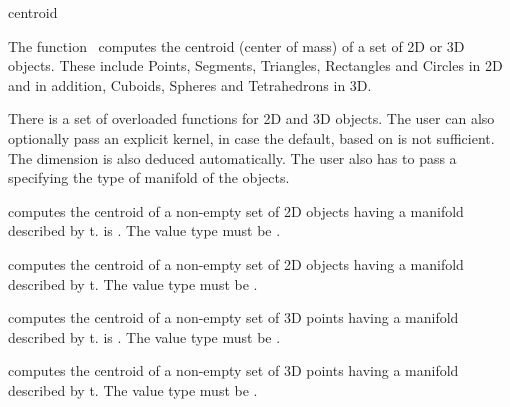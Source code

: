 
\begin{ccRefFunction}{centroid}  

\ccDefinition
  
The function \ccRefName\ computes the centroid (center of mass) of a set
of 2D or 3D objects. These include Points, Segments, Triangles, Rectangles and Circles in 2D and in addition, Cuboids, Spheres and Tetrahedrons in 3D.


There is a set of overloaded  functions for 2D and 3D objects.
The user can also optionally pass an explicit kernel, in case the default,
based on  is not sufficient.
The dimension is also deduced automatically. The user also has to pass a 
specifying the type of manifold of the objects.

{ computes the centroid of a non-empty set of 2D objects having a manifold described by t.
   is .  The value type must be .
 }

{ computes the centroid of a non-empty set of 2D objects having a manifold described by t.
  The value type must be .
 }

{ computes the centroid of a non-empty set of 3D points having a manifold described by t.
   is .
  The value type must be .
 }

{ computes the centroid of a non-empty set of 3D points having a manifold described by t.
  The value type must be .
 }


\ccSeeAlso
{}

\end{ccRefFunction}
